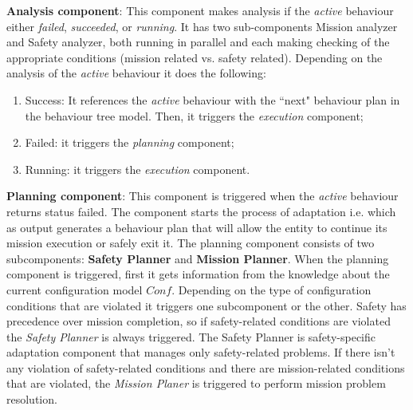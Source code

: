 \documentclass[journal]{IEEEtran}
\theoremstyle{definition}
\begin{document}
\textbf{Analysis component}: This component makes analysis if 
the \textit{active} behaviour either \textit{failed}, \textit{succeeded}, or \textit{running}. It has two sub-components Mission analyzer and Safety analyzer, both running in parallel and each making checking of the appropriate conditions (mission related vs. safety related).
Depending on the analysis of the \textit{active} behaviour it does the following:
\begin{enumerate}
\item  Success: 
It references the \textit{active} behaviour with the ``next" behaviour plan in the behaviour tree model. Then, it triggers the \textit{execution} component;
\item Failed:  it triggers the \textit{planning} component;
\item Running: it triggers the \textit{execution} component.
\end{enumerate}
 
\textbf{Planning component}: This component is triggered when the \textit{active} behaviour returns status failed. %
The component starts the process of adaptation i.e. which as output generates a behaviour plan that will allow the entity to continue its mission execution or safely exit it.
The  planning component consists of two subcomponents: \textbf{Safety Planner} and \textbf{Mission Planner}.  When the planning component is triggered, first it gets information from the knowledge about the current configuration model $Conf$.  
Depending on the type of configuration conditions that are violated it triggers one subcomponent or the other. Safety has precedence over mission completion, so  if safety-related conditions are violated the \textit{Safety Planner} is always triggered. The Safety Planner is safety-specific adaptation component that manages only safety-related problems. If there isn't any violation of safety-related conditions and there are mission-related conditions that are violated, the \textit{Mission Planer} is triggered to perform mission problem resolution. 
\end{document}
